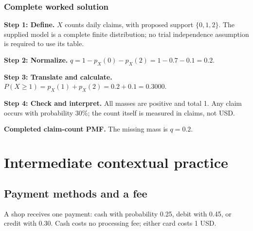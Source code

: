 \subsubsection*{Complete worked solution}
\par\noindent\begin{minipage}{\linewidth}
\textbf{Step 1: Define.} $X$ counts daily claims, with proposed support $\{0,1,2\}$. The supplied model is a complete finite distribution; no trial independence assumption is required to use its table.
\end{minipage}\par\medskip
\par\noindent\begin{minipage}{\linewidth}
\textbf{Step 2: Normalize.} $q=1-p_X(0)-p_X(2)=1-0.7-0.1=0.2$.
\end{minipage}\par\medskip
\par\noindent\begin{minipage}{\linewidth}
\textbf{Step 3: Translate and calculate.} $P(X\geq1)=p_X(1)+p_X(2)=0.2+0.1=0.3000$.
\end{minipage}\par\medskip
\par\noindent\begin{minipage}{\linewidth}
\textbf{Step 4: Check and interpret.} All masses are positive and total 1. Any claim occurs with probability 30\%; the count itself is measured in claims, not USD.
\end{minipage}\par\medskip
\par\noindent \begin{minipage}[t]{.485\linewidth}
\centering
{}
\par\small \textbf{Completed claim-count PMF.} The missing mass is $q=0.2$.
\end{minipage}\par\medskip

\section{Intermediate contextual practice}\label{sec:t2-c1-intermediate}
\subsection{Payment methods and a fee}
A shop receives one payment: cash with probability 0.25, debit with 0.45, or credit with 0.30. Cash costs no processing fee; either card costs 1 USD.

